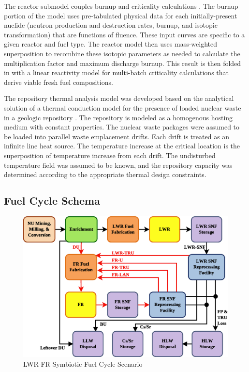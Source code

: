 The reactor submodel couples burnup and criticality calculations \cite{Scopatz2009}. The burnup portion of the
model uses pre-tabulated physical data for each initially-present nuclide (neutron production and destruction
rates, burnup, and isotopic transformation) that are functions of fluence. These input curves are specific to a
given reactor and fuel type. The reactor model then uses mass-weighted superposition to recombine these
isotopic parameters as needed to calculate the multiplication factor and maximum discharge burnup. This result is
then folded in with a linear reactivity model for multi-batch criticality calculations that derive viable
fresh fuel compositions.

The repository thermal analysis model was developed based on the
analytical solution of a thermal conduction model for the presence of
loaded nuclear waste in a geologic repository \cite{Li2010a}. The
repository is modeled as a homogenous hosting medium with constant
properties. The nuclear waste packages were assumed to be loaded into parallel
waste emplacement drifts. Each drift is treated as
an infinite line heat source. The temperature increase at the critical
location is the superposition of temperature increase from each drift. The
undisturbed temperature field was assumed to be known, and the repository
capacity was determined according to the appropriate thermal design
constraints.



\subsection{Fuel Cycle Schema}
\label{cts_sec:fcschema}

\begin{figure}[htbp]
\begin{center}
\includegraphics[scale=0.50]{ct_sensitivity/figs/LWR_FR.eps}
\caption{LWR-FR Symbiotic Fuel Cycle Scenario}
\label{lwr_fr_fc}
\end{center}
\end{figure}

